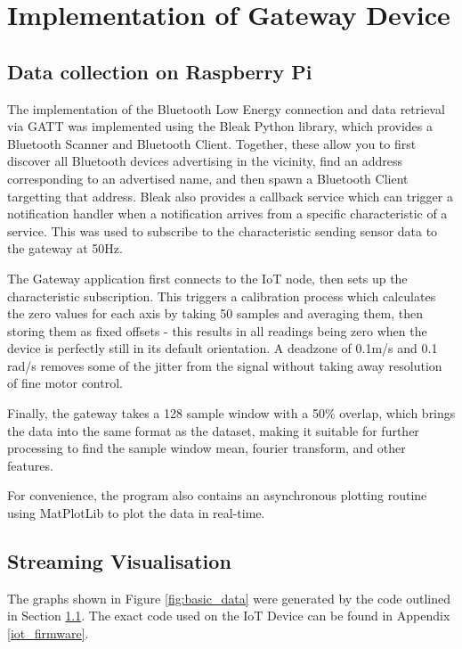 \documentclass[conference]{IEEEtran}
\begin{document}
\section{Implementation of Gateway Device}
\subsection{Data collection on Raspberry Pi}\label{data_collection}
The implementation of the Bluetooth Low Energy connection and data retrieval via GATT was implemented using the Bleak Python library, which provides a Bluetooth Scanner and Bluetooth Client. Together, these allow you to first discover all Bluetooth devices advertising in the vicinity, find an address corresponding to an advertised name, and then spawn a Bluetooth Client targetting that address. Bleak also provides a callback service which can trigger a notification handler when a notification arrives from a specific characteristic of a service. This was used to subscribe to the characteristic sending sensor data to the gateway at 50Hz.

The Gateway application first connects to the IoT node, then sets up the characteristic subscription. This triggers a calibration process which calculates the zero values for each axis by taking 50 samples and averaging them, then storing them as fixed offsets - this results in all readings being zero when the device is perfectly still in its default orientation. A deadzone of 0.1m/s and 0.1 rad/s removes some of the jitter from the signal without taking away resolution of fine motor control.

Finally, the gateway takes a 128 sample window with a 50\% overlap, which brings the data into the same format as the dataset, making it suitable for further processing to find the sample window mean, fourier transform, and other features.

For convenience, the program also contains an asynchronous plotting routine using MatPlotLib to plot the data in real-time.

\subsection{Streaming Visualisation}
The graphs shown in Figure \ref{fig:basic_data} were generated by the code outlined in Section  \ref{data_collection}. The exact code used on the IoT Device can be found in Appendix \ref{iot_firmware}.
\end{document}
